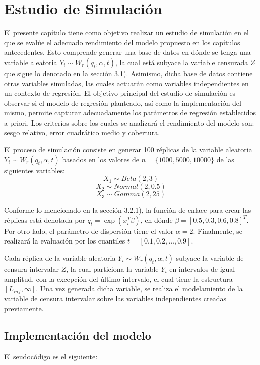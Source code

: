 \chapter{Estudio de Simulación}
El presente capítulo tiene como objetivo realizar un estudio de simulación en el que se evalúe el adecuado rendimiento del modelo propuesto en los capítulos antecedentes. Esto comprende generar una base de datos en dónde se tenga una variable aleatoria $Y_i \sim W_r(q_t, \alpha,t)$, la cual está subyace la variable censurada $Z$ que sigue lo denotado en la sección 3.1). Asimismo, dicha base de datos contiene otras variables simuladas, las cuales actuarán como variables independientes en un contexto de regresión. El objetivo principal del estudio de simulación es observar si el modelo de regresión planteado, así como la implementación del mismo, permite capturar adecuadamente los parámetros de regresión establecidos a priori. Los criterios sobre los cuales se analizará el rendimiento del modelo son: sesgo relativo, error cuadrático medio y cobertura.

El proceso de simulación consiste en generar 100 réplicas de la variable aleatoria $Y_i \sim W_r(q_t, \alpha,t)$ basados en los valores de $n=\{1000, 5000, 10000\}$ de las siguientes variables:
\[X_{1} \sim Beta(2,3)\]
\[X_{2} \sim Normal(2,0.5)\]
\[X_{3} \sim Gamma(2,25)\]

Conforme lo mencionado en la sección 3.2.1), la función de enlace para crear las réplicas está denotada por $q_t =  \exp(x_i^T \beta)$, en dónde $\beta =[0.5, 0.3, 0.6, 0.8]^T$. Por otro lado, el parámetro de dispersión tiene el valor $\alpha = 2$. Finalmente, se realizará la evaluación por los cuantiles $t = [0.1, 0.2, \dots, 0.9]$.

Cada réplica de la variable aleatoria $Y_i \sim W_r(q_t, \alpha,t)$ subyace la variable de censura intervalar $Z$, la cual particiona la variable $Y_i$ en intervalos de igual amplitud, con la excepción del último intervalo, el cual tiene la estructura $[L_{inf}, \infty]$. Una vez generada dicha variable, se realiza el modelamiento de la variable de censura intervalar sobre las variables independientes creadas previamente.

\section{Implementación del modelo}

El seudocódigo es el siguiente:

